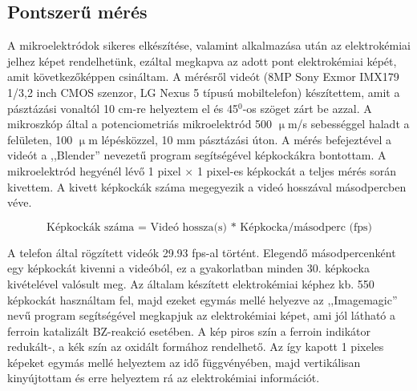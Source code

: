 \subsection{Pontszerű mérés}
A mikroelektródok sikeres elkészítése, valamint alkalmazása után az elektrokémiai jelhez képet rendelhetünk, ezáltal megkapva az adott pont elektrokémiai képét, amit következőképpen csináltam. A mérésről videót (8MP Sony Exmor IMX179 1/3,2 inch CMOS szenzor, LG Nexus 5 típusú mobiltelefon) készítettem, amit a pásztázási vonaltól 10 cm-re helyeztem el és 45$^0$-os szöget zárt be azzal. A mikroszkóp által a potenciometriás mikroelektród 500 $\upmu$m/s sebességgel haladt a felületen, 100 $\upmu$m lépésközzel, 10 mm pásztázási úton. A mérés befejeztével a videót a ,,Blender'' \cite{blender} nevezetű program segítségével képkockákra bontottam. A mikroelektród hegyénél lévő 1 pixel $\times$ 1 pixel-es képkockát a teljes mérés során kivettem. A kivett képkockák száma megegyezik a videó hosszával másodpercben véve.

\begin{equation} 
\textrm{Képkockák száma = Videó hossza(s) * Képkocka/másodperc (fps)}
\end{equation}

A telefon által rögzített videók 29.93 fps-al történt. Elegendő másodpercenként egy képkockát kivenni a videóból, ez a gyakorlatban minden 30. képkocka kivételével valósult meg.
Az általam készített elektrokémiai képhez kb. 550 képkockát használtam fel, majd ezeket egymás mellé helyezve az ,,Imagemagic'' \cite{imagemagick} nevű program segítségével megkapjuk az elektrokémiai képet, ami jól látható a ferroin katalizált BZ-reakció esetében. A kép piros szín a ferroin indikátor redukált-, a kék szín az oxidált formához rendelhető. Az így kapott 1 pixeles képeket egymás mellé helyeztem az idő függvényében, majd vertikálisan kinyújtottam és erre helyeztem rá az elektrokémiai információt.

